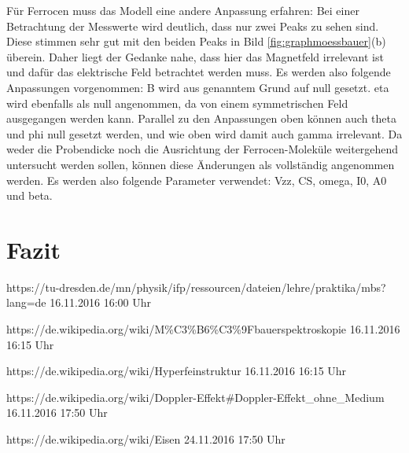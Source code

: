 \documentclass[german, %
parskip=full, %
bibliography=totoc, %
]{scrartcl}
\begin{document}
Für Ferrocen muss das Modell eine andere Anpassung erfahren: Bei einer Betrachtung der Messwerte wird deutlich, dass nur zwei Peaks zu sehen sind. Diese stimmen sehr gut mit den beiden Peaks in Bild \ref{fig:graphmoessbauer}(b) überein. Daher liegt der Gedanke nahe, dass hier das Magnetfeld irrelevant ist und dafür das elektrische Feld betrachtet werden muss. Es werden also folgende Anpassungen vorgenommen: B wird aus genanntem Grund auf null gesetzt. eta wird ebenfalls als null angenommen, da von einem symmetrischen Feld ausgegangen werden kann. Parallel zu den Anpassungen oben können auch theta und phi null gesetzt werden, und wie oben wird damit auch gamma irrelevant. Da weder die Probendicke noch die Ausrichtung der Ferrocen-Moleküle weitergehend untersucht werden sollen, können diese Änderungen als vollständig angenommen werden. Es werden also folgende Parameter verwendet: Vzz, CS, omega, I0, A0 und beta.

\section{Fazit}




\begin{thebibliography}{9}

  https://tu-dresden.de/mn/physik/ifp/ressourcen/dateien/lehre/praktika/mbs?lang=de
	16.11.2016
	16:00 Uhr
	
  https://de.wikipedia.org/wiki/M\%C3\%B6\%C3\%9Fbauerspektroskopie
	16.11.2016
	16:15 Uhr
	
  https://de.wikipedia.org/wiki/Hyperfeinstruktur
	16.11.2016
	16:15 Uhr
	
  https://de.wikipedia.org/wiki/Doppler-Effekt\#Doppler-Effekt\_ohne\_Medium
	16.11.2016
	17:50 Uhr
	
  https://de.wikipedia.org/wiki/Eisen
	24.11.2016
	17:50 Uhr

\end{thebibliography}
\end{document}
